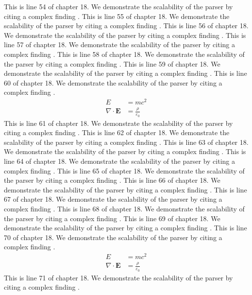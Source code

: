 This is line 54 of chapter 18. We demonstrate the scalability of the parser by citing a complex finding \cite{ref18_54}.
This is line 55 of chapter 18. We demonstrate the scalability of the parser by citing a complex finding \cite{ref18_55}.
This is line 56 of chapter 18. We demonstrate the scalability of the parser by citing a complex finding \cite{ref18_56}.
This is line 57 of chapter 18. We demonstrate the scalability of the parser by citing a complex finding \cite{ref18_57}.
This is line 58 of chapter 18. We demonstrate the scalability of the parser by citing a complex finding \cite{ref18_58}.
This is line 59 of chapter 18. We demonstrate the scalability of the parser by citing a complex finding \cite{ref18_59}.
This is line 60 of chapter 18. We demonstrate the scalability of the parser by citing a complex finding \cite{ref18_60}.
\begin{align*}
  E &= mc^2 \\
  \nabla \cdot \mathbf{E} &= \frac{\rho}{\varepsilon_0}
\end{align*}
This is line 61 of chapter 18. We demonstrate the scalability of the parser by citing a complex finding \cite{ref18_61}.
This is line 62 of chapter 18. We demonstrate the scalability of the parser by citing a complex finding \cite{ref18_62}.
This is line 63 of chapter 18. We demonstrate the scalability of the parser by citing a complex finding \cite{ref18_63}.
This is line 64 of chapter 18. We demonstrate the scalability of the parser by citing a complex finding \cite{ref18_64}.
This is line 65 of chapter 18. We demonstrate the scalability of the parser by citing a complex finding \cite{ref18_65}.
This is line 66 of chapter 18. We demonstrate the scalability of the parser by citing a complex finding \cite{ref18_66}.
This is line 67 of chapter 18. We demonstrate the scalability of the parser by citing a complex finding \cite{ref18_67}.
This is line 68 of chapter 18. We demonstrate the scalability of the parser by citing a complex finding \cite{ref18_68}.
This is line 69 of chapter 18. We demonstrate the scalability of the parser by citing a complex finding \cite{ref18_69}.
This is line 70 of chapter 18. We demonstrate the scalability of the parser by citing a complex finding \cite{ref18_70}.
\begin{align*}
  E &= mc^2 \\
  \nabla \cdot \mathbf{E} &= \frac{\rho}{\varepsilon_0}
\end{align*}
This is line 71 of chapter 18. We demonstrate the scalability of the parser by citing a complex finding \cite{ref18_71}.
